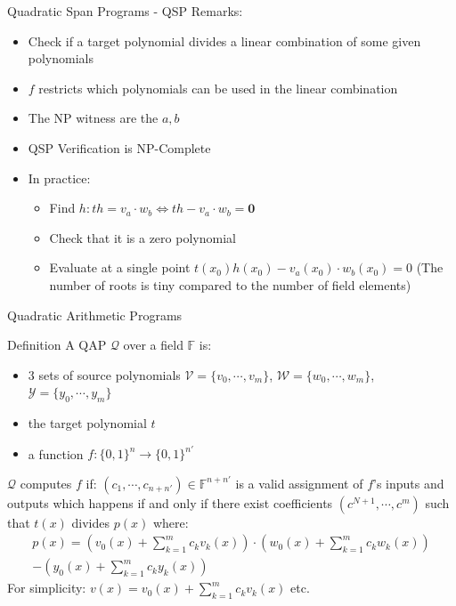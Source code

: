 \documentclass[handout]{beamer}
\begin{document}
\begin{frame}[allowframebreaks]{Quadratic Span Programs - QSP}
Remarks: 

\begin{itemize}
    \item Check if a target polynomial divides a linear combination of some given polynomials
    \item $f$ restricts which polynomials can be used in the linear combination
    \item The NP witness are the $a,b$
    \item QSP Verification is NP-Complete 
    \item In practice:
    \begin{itemize}
        \item Find $h: th = v_a \cdot w_b \Leftrightarrow th - v_a \cdot w_b = \textbf{0}$       
        \item Check that it is a zero polynomial
        \item Evaluate at a single point $t(x_0)h(x_0) - v_a(x_0) \cdot w_b(x_0) = 0$ (The number of roots is tiny compared to the number of field elements)
     \end{itemize}
\end{itemize} 
\end{frame}

\begin{frame}[allowframebreaks]{Quadratic Arithmetic Programs}
\begin{block}{Definition}
A QAP $\mathcal{Q}$ over a field $\mathbb{F}$ is:
\begin{itemize}
    \item 3 sets of source polynomials $\mathcal{V} = \{v_0, \cdots, v_m \}$, $\mathcal{W} = \{ w_0, \cdots, w_m \}$, $\mathcal{Y}  = \{y_0, \cdots, y_m \}$
    \item the target polynomial $t$
    \item a function $f : \{0,1\}^n \rightarrow \{0,1\}^{n'}$
\end{itemize}
\end{block}

\framebreak

$\mathcal{Q}$ computes $f$ if:
 $ (c_1, \cdots ,c_{n+n'}) \in \mathbb{F}^{n+n'}$ is a valid assignment of
$f$’s inputs and outputs which happens
if and only if there exist coefficients $(c^{N+1},\cdots,c^m)$ such that $t(x)$ divides $p(x)$ where:
\begin{align*}
p(x) = (v_0(x)+\sum_{k=1}^m c_k v_k(x)) \cdot (w_0(x)+  \sum_{k=1}^m c_k w_k(x))\\ - (y_0(x)+\sum_{k=1}^m c_k y_k(x))
\end{align*}
For simplicity: $v(x)= v_0(x)+\sum_{k=1}^m c_k v_k(x)$ etc.
\end{frame}
\end{document}
